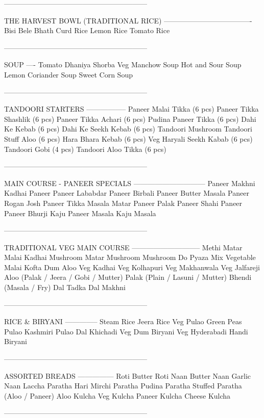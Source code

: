 ------------------------------------------------------------

THE HARVEST BOWL (TRADITIONAL RICE)
-------------------------------------
Bisi Bele Bhath
Curd Rice
Lemon Rice
Tomato Rice

------------------------------------------------------------

SOUP
----
Tomato Dhaniya Shorba
Veg Manchow Soup
Hot and Sour Soup
Lemon Coriander Soup
Sweet Corn Soup

------------------------------------------------------------

TANDOORI STARTERS
-----------------
Paneer Malai Tikka (6 pcs)
Paneer Tikka Shashlik (6 pcs)
Paneer Tikka Achari (6 pcs)
Pudina Paneer Tikka (6 pcs)
Dahi Ke Kebab (6 pcs)
Dahi Ke Seekh Kebab (6 pcs)
Tandoori Mushroom
Tandoori Stuff Aloo (6 pcs)
Hara Bhara Kebab (6 pcs)
Veg Haryali Seekh Kabab (6 pcs)
Tandoori Gobi (4 pcs)
Tandoori Aloo Tikka (6 pcs)

------------------------------------------------------------

MAIN COURSE - PANEER SPECIALS
------------------------------
Paneer Makhni
Kadhai Paneer
Paneer Lababdar
Paneer Birbali
Paneer Butter Masala
Paneer Rogan Josh
Paneer Tikka Masala
Matar Paneer
Palak Paneer
Shahi Paneer
Paneer Bhurji
Kaju Paneer Masala
Kaju Masala

------------------------------------------------------------

TRADITIONAL VEG MAIN COURSE
-----------------------------
Methi Matar Malai
Kadhai Mushroom
Matar Mushroom
Mushroom Do Pyaza
Mix Vegetable
Malai Kofta
Dum Aloo
Veg Kadhai
Veg Kolhapuri
Veg Makhanwala
Veg Jalfareji
Aloo (Palak / Jeera / Gobi / Mutter)
Palak (Plain / Lasuni / Mutter)
Bhendi (Masala / Fry)
Dal Tadka
Dal Makhni

------------------------------------------------------------

RICE & BIRYANI
--------------
Steam Rice
Jeera Rice
Veg Pulao
Green Peas Pulao
Kashmiri Pulao
Dal Khichadi
Veg Dum Biryani
Veg Hyderabadi Handi Biryani

------------------------------------------------------------

ASSORTED BREADS
---------------
Roti
Butter Roti
Naan
Butter Naan
Garlic Naan
Laccha Paratha
Hari Mirchi Paratha
Pudina Paratha
Stuffed Paratha (Aloo / Paneer)
Aloo Kulcha
Veg Kulcha
Paneer Kulcha
Cheese Kulcha

------------------------------------------------------------

